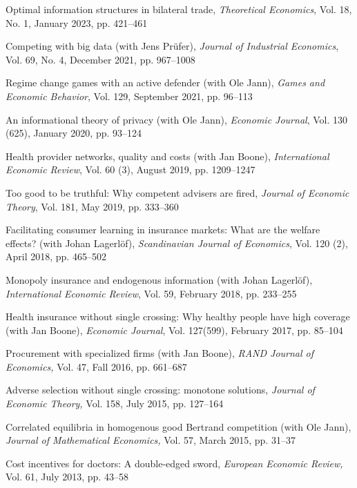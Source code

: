 \documentclass[a4paper]{article}
\renewenvironment{itemize}{
  \begin{list}{}{
    \setlength{\leftmargin}{1.5em}
  }
}{
  \end{list}
}
\begin{document}
%
\begin{itemize}
\item Optimal information structures in bilateral trade, \emph{Theoretical Economics}, Vol. 18, No. 1, January 2023, pp. 421--461
  
\item Competing with big data (with Jens Pr\"ufer), \emph{Journal of Industrial Economics}, Vol. 69, No. 4, December 2021, pp. 967--1008
  
\item Regime change games with an active defender (with Ole Jann), \emph{Games and Economic Behavior}, Vol. 129, September 2021, pp. 96--113
  
\item An informational theory of privacy (with Ole Jann), \emph{Economic Journal}, Vol. 130 (625), January 2020, pp. 93--124
  
\item Health provider networks, quality and costs (with Jan Boone), \emph{International Economic Review}, Vol. 60 (3), August 2019, pp. 1209--1247

\item Too good to be truthful: Why competent advisers are fired, \emph{Journal of Economic Theory}, Vol. 181, May 2019, pp. 333--360
  
\item Facilitating consumer learning in insurance markets: What are the welfare effects? (with Johan Lagerl\"of), \emph{Scandinavian Journal of Economics}, Vol. 120 (2), April 2018, pp. 465--502
  
\item Monopoly insurance and endogenous information (with Johan Lagerl\"of), \emph{International Economic Review}, Vol. 59, February 2018, pp. 233--255

\item Health insurance without single crossing: Why healthy
people have high coverage (with Jan Boone), \textit{Economic Journal}, Vol. 127(599), February 2017, pp. 85--104

\item Procurement with specialized firms (with Jan Boone), \textit{RAND Journal of Economics,} Vol. 47, Fall 2016, pp. 661--687

\item Adverse selection without single crossing: monotone solutions, \textit{Journal of Economic Theory,} Vol. 158, July 2015, pp. 127--164

\item Correlated equilibria in homogenous good Bertrand competition (with Ole Jann), \textit{Journal of Mathematical Economics,}  Vol. 57, March 2015, pp. 31--37

\item Cost incentives for doctors: A double-edged sword, \textit{European Economic Review,} Vol. 61, July 2013, pp. 43--58

\end{itemize}
\end{document}
